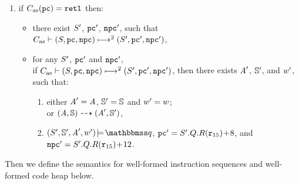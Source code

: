 \begin{definition}
\begin{enumerate}[1.]
        \item if {\em $\asmimp(\pc) = \retl$} then:
            \begin{itemize}
                \item there exist $\state'$, {\em $\pc'$}, {\em $\npc'$}, such that
                \\
                {\em $\multilptrans{\asmimp}{2}{(\state, \pc, \npc)}
                    {(\state', \pc', \npc')}$},

                \item for any {\em $\state'$}, {\em $\pc'$} 
                and {\em $\npc'$}, \\
                if
                {\em $\multilptrans{\asmimp}{2}{(\state, \pc, \npc)}{(\state', \pc', \npc')}$},
                then there exists {\em $\primcom'$}, {\em $\hpstate'$}, and {\em $\word'$},
                such that:
                \begin{enumerate}[(1)]
                    \item either $\primcom' = \primcom$,
                    $\hpstate' = \hpstate$ and $\word' = \word$; \\
                    or
                    $\primTrans{(\primcom, \hpstate)}
                        {(\primcom', \hpstate')}$,
                    \item $\asrtmodel{(\state', \hpstate', \primcom', \word')}
                        {\relastQ}$,
                        {\em $\pc' = \state'.\Rstate.\RFile(\reg{15}) \!+\! 8$},
                        and
                        {\em $\npc' = \state'.\Rstate.\RFile(\reg{15}) \!+\! 12$}.
                \end{enumerate}
            \end{itemize}
    \end{enumerate}
\end{definition}

Then we define the semantics for well-formed instruction
sequences and well-formed code heap below.

